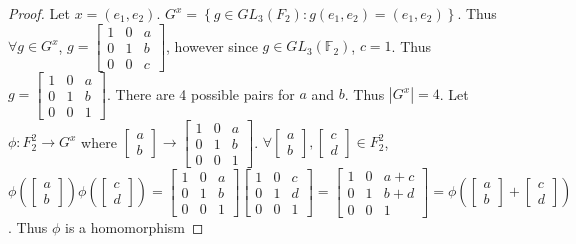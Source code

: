 \documentclass{article}
\newcommand*{\F}{\mathbb{F}}
\begin{document}
\begin{proof}
    
    Let $x = (e_1, e_2)$. $G^x = \left\{ g \in GL_3(F_2) : g(e_1, e_2) = (e_1, e_2) \right\}$. Thus $\forall g \in G^x$, $g = \begin{bmatrix}
        1 & 0 & a\\ 0 & 1 & b \\ 0 & 0 & c 
    \end{bmatrix}$, however since $g \in GL_3(\F_2)$, $c = 1$. Thus $g = \begin{bmatrix}
        1 & 0 & a\\ 0 & 1 & b \\ 0 & 0 & 1
    \end{bmatrix}$. There are 4 possible pairs for $a$ and $b$. Thus $|G^x| = 4$. Let $\phi: F_2^2 \to G^x$ where $\begin{bmatrix}
        a \\ b
    \end{bmatrix} \to \begin{bmatrix}
        1 & 0 & a\\ 0 & 1 & b \\ 0 & 0 & 1
    \end{bmatrix}$. $\forall \begin{bmatrix}
        a \\ b
    \end{bmatrix}, \begin{bmatrix}
        c \\ d
    \end{bmatrix} \in F_2^2$, $\phi(\begin{bmatrix}
        a \\ b
    \end{bmatrix})\phi(\begin{bmatrix}
        c \\ d
    \end{bmatrix}) = \begin{bmatrix}
        1 & 0 & a\\ 0 & 1 & b \\ 0 & 0 & 1
    \end{bmatrix}\begin{bmatrix}
        1 & 0 & c\\ 0 & 1 & d \\ 0 & 0 & 1
    \end{bmatrix} = \begin{bmatrix}
        1 & 0 & a + c\\ 0 & 1 & b + d \\ 0 & 0 & 1
    \end{bmatrix} = \phi(\begin{bmatrix}
        a \\ b
    \end{bmatrix} + \begin{bmatrix}
        c \\ d
    \end{bmatrix})$. Thus $\phi$ is a homomorphism   
    

\end{proof}
\end{document}
